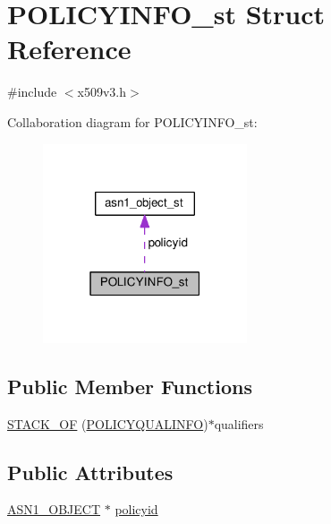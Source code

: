 \hypertarget{struct_p_o_l_i_c_y_i_n_f_o__st}{}\section{P\+O\+L\+I\+C\+Y\+I\+N\+F\+O\+\_\+st Struct Reference}
\label{struct_p_o_l_i_c_y_i_n_f_o__st}


{\ttfamily \#include $<$x509v3.\+h$>$}



Collaboration diagram for P\+O\+L\+I\+C\+Y\+I\+N\+F\+O\+\_\+st\+:
\nopagebreak
\begin{figure}[H]
\begin{center}
\leavevmode
\includegraphics[width=171pt]{struct_p_o_l_i_c_y_i_n_f_o__st__coll__graph}
\end{center}
\end{figure}
\subsection*{Public Member Functions}
\begin{DoxyCompactItemize}
\item 
\hyperlink{struct_p_o_l_i_c_y_i_n_f_o__st_a074f0246ac141ce515ffaffc9e202e9d}{S\+T\+A\+C\+K\+\_\+\+OF} (\hyperlink{x509v3_8h_a2f82c96293f325f0a4f9899e4c0e8426}{P\+O\+L\+I\+C\+Y\+Q\+U\+A\+L\+I\+N\+FO})$\ast$qualifiers
\end{DoxyCompactItemize}
\subsection*{Public Attributes}
\begin{DoxyCompactItemize}
\item 
\hyperlink{asn1_8h_ae10c08e4e6b23f67a39b2add932ec48f}{A\+S\+N1\+\_\+\+O\+B\+J\+E\+CT} $\ast$ \hyperlink{struct_p_o_l_i_c_y_i_n_f_o__st_afa7cdfb1bac54134558368a3fe4cb61d}{policyid}
\end{DoxyCompactItemize}


